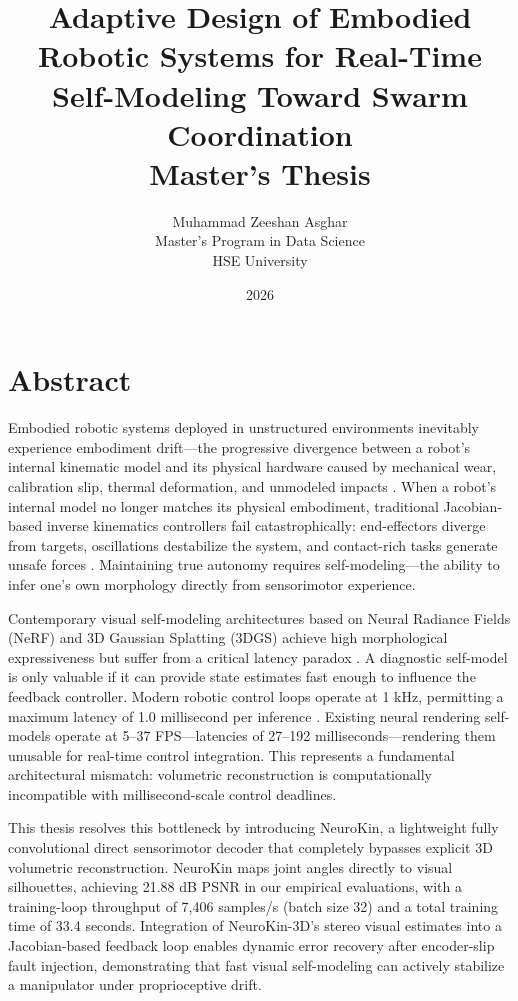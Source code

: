 \documentclass[12pt,a4paper,oneside]{report}
\title{
    \vspace{2cm}
    \textbf{\Large Adaptive Design of Embodied Robotic Systems for Real-Time Self-Modeling Toward Swarm Coordination} \\
    \vspace{1cm}
    \large Master's Thesis
}
\author{
    Muhammad Zeeshan Asghar \\
    Master's Program in Data Science \\
    HSE University
}
\date{\vspace{1cm} 2026}
\begin{document}

\clearpage

\chapter*{Abstract}

Embodied robotic systems deployed in unstructured environments inevitably experience embodiment drift—the progressive divergence between a robot's internal kinematic model and its physical hardware caused by mechanical wear, calibration slip, thermal deformation, and unmodeled impacts \cite{bongard2006resilient, cully2015robots}. When a robot's internal model no longer matches its physical embodiment, traditional Jacobian-based inverse kinematics controllers fail catastrophically: end-effectors diverge from targets, oscillations destabilize the system, and contact-rich tasks generate unsafe forces \cite{kwiatkowski2019task, chen2022full}. Maintaining true autonomy requires self-modeling—the ability to infer one's own morphology directly from sensorimotor experience.

Contemporary visual self-modeling architectures based on Neural Radiance Fields (NeRF) and 3D Gaussian Splatting (3DGS) achieve high morphological expressiveness but suffer from a critical latency paradox \cite{hu2024teaching, hu2025learning}. A diagnostic self-model is only valuable if it can provide state estimates fast enough to influence the feedback controller. Modern robotic control loops operate at 1 kHz, permitting a maximum latency of 1.0 millisecond per inference \cite{siciliano2009robotics}. Existing neural rendering self-models operate at 5–37 FPS—latencies of 27–192 milliseconds—rendering them unusable for real-time control integration. This represents a fundamental architectural mismatch: volumetric reconstruction is computationally incompatible with millisecond-scale control deadlines.

This thesis resolves this bottleneck by introducing NeuroKin, a lightweight fully convolutional direct sensorimotor decoder that completely bypasses explicit 3D volumetric reconstruction. NeuroKin maps joint angles directly to visual silhouettes, achieving 21.88 dB PSNR in our empirical evaluations, with a training-loop throughput of 7,406 samples/s (batch size 32) and a total training time of 33.4 seconds. Integration of NeuroKin-3D's stereo visual estimates into a Jacobian-based feedback loop enables dynamic error recovery after encoder-slip fault injection, demonstrating that fast visual self-modeling can actively stabilize a manipulator under proprioceptive drift.
\end{document}
